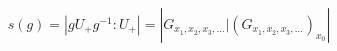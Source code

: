\documentclass[preview]{standalone}
\begin{document}
\begin{align*}
s(g) = \left|gU_+g^{-1} : U_+\right| =  \left|G_{x_1, x_2, x_3, \dots} | \left(G_{x_1, x_2, x_3, \dots}\right)_{x_0} \right|
\end{align*}
\end{document}
